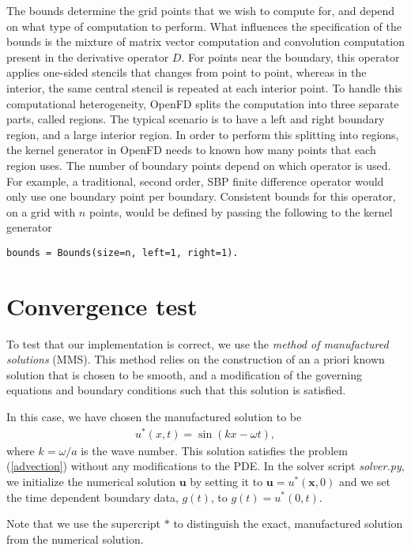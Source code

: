 \documentclass[a4paper]{article}
\newcommand{\ub}{\mathbf{u}}
\newcommand{\xb}{\mathbf{x}}
\begin{document}
The bounds determine the grid points that we wish to compute for, and depend
on what type of computation to perform. What influences the specification of the
bounds is the mixture of matrix vector computation and convolution computation
present in the derivative operator $D$. For points near the boundary, this
operator applies one-sided stencils that changes from point to point, whereas in
the interior, the same central stencil is repeated at each interior point. To
handle this computational heterogeneity, OpenFD splits the computation into
three separate parts, called regions. The typical scenario is to have a left
and right boundary region, and a large interior region. In order to perform this
splitting into regions, the kernel generator in OpenFD needs to known how many
points that each region uses. The number of boundary points depend on which
operator is used. For example, a traditional, second order, SBP finite
difference operator would only use one boundary point per boundary. Consistent
bounds for this operator, on a grid with $n$ points, would be defined by passing
the following to the kernel generator
\begin{verbatim}
bounds = Bounds(size=n, left=1, right=1).
\end{verbatim}

\section{Convergence test}
To test that our implementation is correct, we use the \emph{method of
manufactured solutions} (MMS). This method relies on the construction of an a
priori known solution that is chosen to be smooth, and a modification of the
governing equations and boundary conditions such that this solution is
satisfied. 

In this case, we have chosen the manufactured solution to be
\begin{align}
u^*(x, t) = \sin(k x - \omega t), 
\end{align}
where $k = \omega/a$ is the wave number. This solution satisfies the problem
(\ref{advection}) without any modifications to the PDE. In the solver script
\emph{solver.py}, we initialize the numerical solution $\ub$ by setting it to
$\ub = u^*(\xb, 0)$ and we set the time dependent boundary data, $g(t)$, to $
g(t) = u^*(0, t)$.

Note that we use the supercript $*$ to distinguish the exact, manufactured
solution from the numerical solution.
\end{document}
